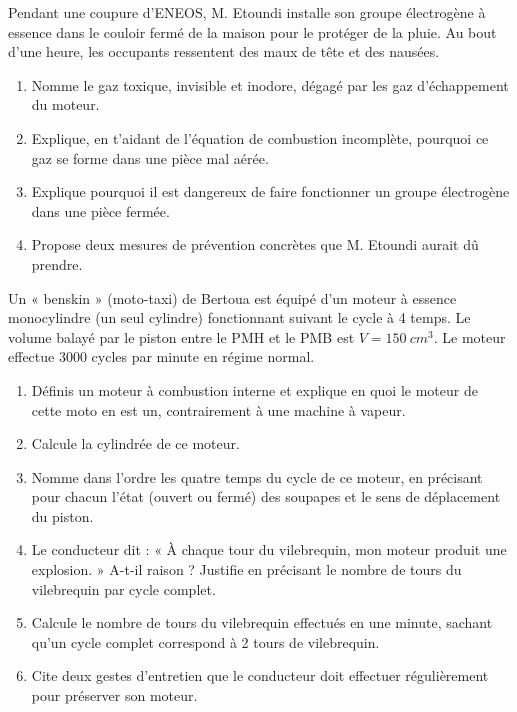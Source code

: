 \documentclass[11pt]{article}
\newcounter{popsec}
\newcounter{popsub}
\newcommand{\courssub}[1]{%
  \stepcounter{popsub}%
  \par\vspace{9pt}\noindent{\popxbold\fontsize{11.5}{13}\selectfont\color{popink}{\color{poporange}\thepopsec.\thepopsub}\hspace{6pt}#1}\par\nopagebreak\vspace{4pt}
}
\begin{document}
\begin{exercice}
Pendant une coupure d'ENEOS, M. Etoundi installe son groupe électrogène à essence dans le couloir fermé de la maison pour le protéger de la pluie. Au bout d'une heure, les occupants ressentent des maux de tête et des nausées.
\begin{enumerate}
\item Nomme le gaz toxique, invisible et inodore, dégagé par les gaz d'échappement du moteur.
\item Explique, en t'aidant de l'équation de combustion incomplète, pourquoi ce gaz se forme dans une pièce mal aérée.
\item Explique pourquoi il est dangereux de faire fonctionner un groupe électrogène dans une pièce fermée.
\item Propose deux mesures de prévention concrètes que M. Etoundi aurait dû prendre.
\end{enumerate}
\end{exercice}

\courssub{Je me prépare au Bac}

\begin{exercice}
Un « benskin » (moto-taxi) de Bertoua est équipé d'un moteur à essence monocylindre (un seul cylindre) fonctionnant suivant le cycle à 4 temps. Le volume balayé par le piston entre le PMH et le PMB est $V = \SI{150}{cm^3}$. Le moteur effectue \num{3000} cycles par minute en régime normal.
\begin{enumerate}
\item Définis un moteur à combustion interne et explique en quoi le moteur de cette moto en est un, contrairement à une machine à vapeur.
\item Calcule la cylindrée de ce moteur.
\item Nomme dans l'ordre les quatre temps du cycle de ce moteur, en précisant pour chacun l'état (ouvert ou fermé) des soupapes et le sens de déplacement du piston.
\item Le conducteur dit : « À chaque tour du vilebrequin, mon moteur produit une explosion. » A-t-il raison ? Justifie en précisant le nombre de tours du vilebrequin par cycle complet.
\item Calcule le nombre de tours du vilebrequin effectués en une minute, sachant qu'un cycle complet correspond à 2 tours de vilebrequin.
\item Cite deux gestes d'entretien que le conducteur doit effectuer régulièrement pour préserver son moteur.
\end{enumerate}
\end{exercice}
\end{document}
